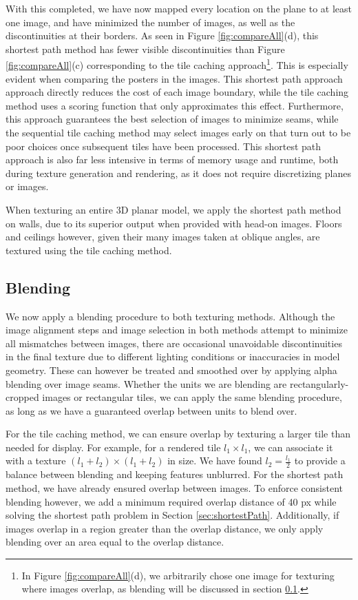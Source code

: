 \documentclass[]{spie}  %
\begin{document}
With this completed, we have now mapped every location on the plane to
at least one image, and have minimized the number of images, as well
as the discontinuities at their borders. As seen in Figure
\ref{fig:compareAll}(d), this shortest path method has fewer visible
discontinuities than Figure \ref{fig:compareAll}(c) corresponding to
the tile caching approach\footnote{In Figure \ref{fig:compareAll}(d),
  we arbitrarily chose one image for texturing where images overlap,
  as blending will be discussed in section \ref{sec:blending}.}. This
is especially evident when comparing the posters in the images. This
shortest path approach approach directly reduces the cost of each
image boundary, while the tile caching method uses a scoring function
that only approximates this effect. Furthermore, this approach
guarantees the best selection of images to minimize seams, while the
sequential tile caching method may select images early on that turn
out to be poor choices once subsequent tiles have been processed. This
shortest path approach is also far less intensive in terms of memory
usage and runtime, both during texture generation and rendering, as it
does not require discretizing planes or images.

When texturing an entire 3D planar model, we apply the shortest path
method on walls, due to its superior output when provided with head-on
images. Floors and ceilings however, given their many images taken at
oblique angles, are textured using the tile caching method.


\subsection{Blending}
\label{sec:blending}
We now apply a blending procedure to both texturing methods. Although
the image alignment steps and image selection in both methods attempt
to minimize all mismatches between images, there are occasional
unavoidable discontinuities in the final texture due to different
lighting conditions or inaccuracies in model geometry. These can
however be treated and smoothed over by applying alpha blending over
image seams.  Whether the units we are blending are
rectangularly-cropped images or rectangular tiles, we can apply the
same blending procedure, as long as we have a guaranteed overlap
between units to blend over.

For the tile caching method, we can ensure overlap by texturing a
larger tile than needed for display. For example, for a rendered tile
$l_1 \times l_1$, we can associate it with a texture $(l_1 + l_2)
\times (l_1 + l_2)$ in size.  We have found $l_2 = \frac{l_1}{2}$ to
provide a balance between blending and keeping features unblurred. For
the shortest path method, we have already ensured overlap between
images. To enforce consistent blending however, we add a minimum
required overlap distance of 40 px while solving the shortest path
problem in Section \ref{sec:shortestPath}. Additionally, if images
overlap in a region greater than the overlap distance, we only apply
blending over an area equal to the overlap distance.
\end{document}
